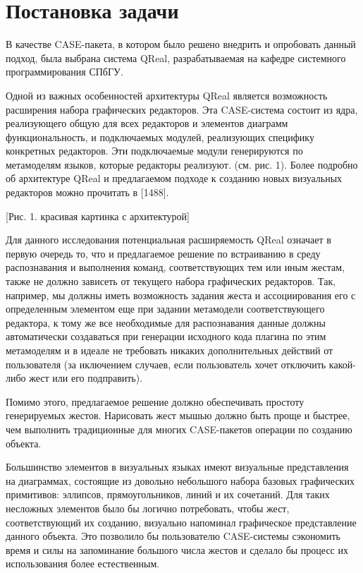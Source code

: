 \documentclass[a5paper]{article}
\begin{document}
\section{Постановка задачи}
В качестве CASE-пакета, в котором было решено внедрить и опробовать данный подход, была выбрана система QReal, разрабатываемая на кафедре 
системного программирования СПбГУ. 

Одной из важных особенностей архитектуры QReal является возможность расширения набора графических редакторов. Эта CASE-система состоит 
из ядра, реализующего общую для всех редакторов и элементов диаграмм функциональность, и подключаемых модулей, реализующих специфику 
конкретных редакторов. Эти подключаемые модули генерируются по метамоделям языков, которые редакторы реализуют. (см. рис. 1). 
Более подробно об архитектуре QReal и предлагаемом подходе к  созданию новых визуальных редакторов можно прочитать в [1488]. 

[Рис. 1. красивая картинка с архитектурой]

Для данного исследования потенциальная расширяемость QReal означает в первую очередь то, что и предлагаемое решение по встраиванию в среду 
распознавания и выполнения команд, соответствующих тем или иным жестам, также не должно зависеть от текущего набора графических редакторов. 
Так, например, мы должны иметь возможность задания жеста и ассоциирования его с определенным элементом еще при задании метамодели 
соответствующего редактора, к тому же все 
необходимые для распознавания данные должны автоматически создаваться при генерации исходного кода плагина по этим метамоделям и в 
идеале не требовать никаких дополнительных действий от пользователя (за иключением случаев, если пользователь хочет отключить какой-либо 
жест или его подправить).

Помимо этого, предлагаемое решение должно обеспечивать простоту генерируемых жестов. Нарисовать жест мышью должно быть проще и быстрее, 
чем выполнить традиционные для многих CASE-пакетов операции по созданию объекта. 

Большинство элементов в визуальных языках имеют визуальные представления на диаграммах, состоящие из довольно небольшого набора базовых графических 
примитивов: эллипсов, прямоугольников, линий и их сочетаний. Для таких несложных элементов было бы логично потребовать, чтобы жест, 
соответствующий их созданию, визуально напоминал графическое представление данного объекта. Это позволило бы пользователю CASE-системы 
сэкономить время и силы на запоминание большого числа жестов и сделало бы процесс их использования более естественным. 
\end{document}
